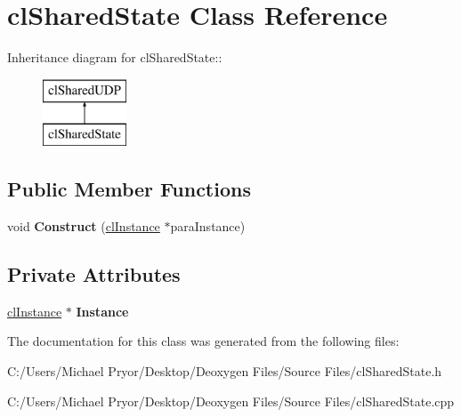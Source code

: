 \hypertarget{classcl_shared_state}{
\section{clSharedState Class Reference}
\label{classcl_shared_state}
}
Inheritance diagram for clSharedState::\begin{figure}[H]
\begin{center}
\leavevmode
\includegraphics[height=2cm]{classcl_shared_state}
\end{center}
\end{figure}
\subsection*{Public Member Functions}
\begin{DoxyCompactItemize}
\item 
\hypertarget{classcl_shared_state_a05e6a20974d3194efe11684968593cb0}{
void {\bfseries Construct} (\hyperlink{classcl_instance}{clInstance} $\ast$paraInstance)}
\label{classcl_shared_state_a05e6a20974d3194efe11684968593cb0}

\end{DoxyCompactItemize}
\subsection*{Private Attributes}
\begin{DoxyCompactItemize}
\item 
\hypertarget{classcl_shared_state_a051172f2ec5d2b1cb7b664e31a39d455}{
\hyperlink{classcl_instance}{clInstance} $\ast$ {\bfseries Instance}}
\label{classcl_shared_state_a051172f2ec5d2b1cb7b664e31a39d455}

\end{DoxyCompactItemize}


The documentation for this class was generated from the following files:\begin{DoxyCompactItemize}
\item 
C:/Users/Michael Pryor/Desktop/Deoxygen Files/Source Files/clSharedState.h\item 
C:/Users/Michael Pryor/Desktop/Deoxygen Files/Source Files/clSharedState.cpp\end{DoxyCompactItemize}
